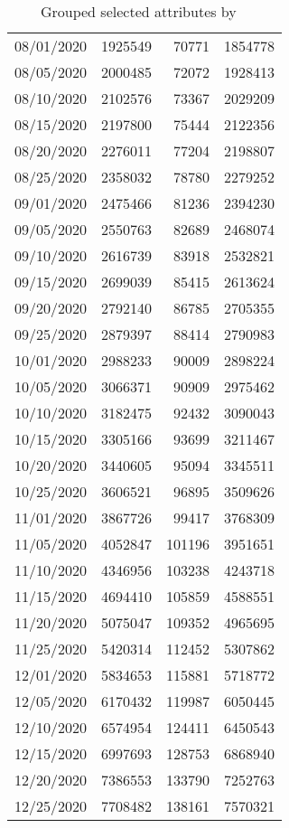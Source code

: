 \begin{table}[h]
\begin{tabular}{lrrr}
        08/01/2020		&		1925549		&		70771		&		1854778 \\
        08/05/2020		&		2000485		&		72072		&		1928413 \\
        08/10/2020		&		2102576		&		73367		&		2029209 \\
        08/15/2020		&		2197800		&		75444		&		2122356 \\
        08/20/2020		&		2276011		&		77204		&		2198807 \\
        08/25/2020		&		2358032		&		78780		&		2279252 \\
        09/01/2020		&		2475466		&		81236		&		2394230 \\
        09/05/2020		&		2550763		&		82689		&		2468074 \\
        09/10/2020		&		2616739		&		83918		&		2532821 \\
        09/15/2020		&		2699039		&		85415		&		2613624 \\
        09/20/2020		&		2792140		&		86785		&		2705355 \\
        09/25/2020		&		2879397		&		88414		&		2790983 \\
        10/01/2020		&		2988233		&		90009		&		2898224 \\
        10/05/2020		&		3066371		&		90909		&		2975462 \\
        10/10/2020		&		3182475		&		92432		&		3090043 \\
        10/15/2020		&		3305166		&		93699		&		3211467 \\
        10/20/2020		&		3440605		&		95094		&		3345511 \\
        10/25/2020		&		3606521		&		96895		&		3509626 \\
        11/01/2020		&		3867726		&		99417		&		3768309 \\
        11/05/2020		&		4052847		&		101196		&		3951651 \\
        11/10/2020		&		4346956		&		103238		&		4243718 \\
        11/15/2020		&		4694410		&		105859		&		4588551 \\
        11/20/2020		&		5075047		&		109352		&		4965695 \\
        11/25/2020		&		5420314		&		112452		&		5307862 \\
        12/01/2020		&		5834653		&		115881		&		5718772 \\
        12/05/2020		&		6170432		&		119987		&		6050445 \\
        12/10/2020		&		6574954		&		124411		&		6450543 \\
        12/15/2020		&		6997693		&		128753		&		6868940 \\
        12/20/2020		&		7386553		&		133790		&		7252763 \\
        12/25/2020		&		7708482		&		138161		&		7570321 \\
        \bottomrule
        \end{tabular}
        \caption{Grouped selected attributes by ~\cite{cdc-dataset}}
        \label{tab:source_numbers}
\end{table}


